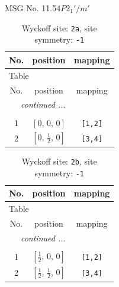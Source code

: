 \documentclass[fleqn,8pt]{jsarticle}
\begin{document}
\setcounter{MaxMatrixCols}{32}

\renewcommand{\tablename}{Table~}
\renewcommand{\figurename}{Figure~}
\begin{center}
\LARGE
MSG No. 11.54\quad$P2_{1}'/m'$
\end{center}
\renewcommand{\arraystretch}{1.2}
\begin{longtable}{ccc}
\caption{Wyckoff site: {\tt 2a}, site symmetry: {\tt -1}}
 \\
 \hline \hline
No. & position & mapping \\ \hline \endfirsthead

\multicolumn{2}{l}{\tablename\ \thetable{}} \\
 \hline \hline
No. & position & mapping \\ \hline \endhead

 \hline \hline
\multicolumn{2}{r}{\footnotesize\it continued ...} \\ \endfoot

 \hline \hline
\multicolumn{2}{r}{} \\ \endlastfoot

1 & $\left[ 0,\, 0,\, 0 \right]$ & {\tt [1,2]} \\ \hline
2 & $\left[ 0,\, \frac{1}{2},\, 0 \right]$ & {\tt [3,4]} \\
\end{longtable}
\renewcommand{\arraystretch}{1.2}
\begin{longtable}{ccc}
\caption{Wyckoff site: {\tt 2b}, site symmetry: {\tt -1}}
 \\
 \hline \hline
No. & position & mapping \\ \hline \endfirsthead

\multicolumn{2}{l}{\tablename\ \thetable{}} \\
 \hline \hline
No. & position & mapping \\ \hline \endhead

 \hline \hline
\multicolumn{2}{r}{\footnotesize\it continued ...} \\ \endfoot

 \hline \hline
\multicolumn{2}{r}{} \\ \endlastfoot

1 & $\left[ \frac{1}{2},\, 0,\, 0 \right]$ & {\tt [1,2]} \\ \hline
2 & $\left[ \frac{1}{2},\, \frac{1}{2},\, 0 \right]$ & {\tt [3,4]} \\
\end{longtable}
\renewcommand{\arraystretch}{1.2}
\end{document}
